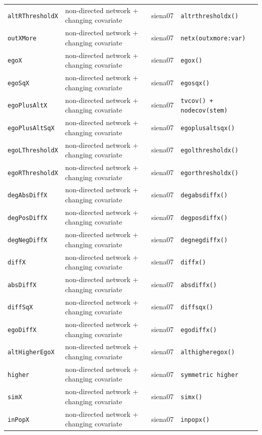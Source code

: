 \begin{longtable}{@{}p{2.6cm}p{3.2cm}p{2.9cm}p{5.4cm}@{}}
\texttt{altRThresholdX} & non-directed network + changing covariate & siena07 & \texttt{altrthresholdx()}\\
\texttt{outXMore} & non-directed network + changing covariate & siena07 & \texttt{netx(outxmore:var)}\\
\texttt{egoX} & non-directed network + changing covariate & siena07 & \texttt{egox()}\\
\texttt{egoSqX} & non-directed network + changing covariate & siena07 & \texttt{egosqx()}\\
\texttt{egoPlusAltX} & non-directed network + changing covariate & siena07 & \texttt{tvcov() + nodecov(stem)}\\
\texttt{egoPlusAltSqX} & non-directed network + changing covariate & siena07 & \texttt{egoplusaltsqx()}\\
\texttt{egoLThresholdX} & non-directed network + changing covariate & siena07 & \texttt{egolthresholdx()}\\
\texttt{egoRThresholdX} & non-directed network + changing covariate & siena07 & \texttt{egorthresholdx()}\\
\texttt{degAbsDiffX} & non-directed network + changing covariate & siena07 & \texttt{degabsdiffx()}\\
\texttt{degPosDiffX} & non-directed network + changing covariate & siena07 & \texttt{degposdiffx()}\\
\texttt{degNegDiffX} & non-directed network + changing covariate & siena07 & \texttt{degnegdiffx()}\\
\texttt{diffX} & non-directed network + changing covariate & siena07 & \texttt{diffx()}\\
\texttt{absDiffX} & non-directed network + changing covariate & siena07 & \texttt{absdiffx()}\\
\texttt{diffSqX} & non-directed network + changing covariate & siena07 & \texttt{diffsqx()}\\
\texttt{egoDiffX} & non-directed network + changing covariate & siena07 & \texttt{egodiffx()}\\
\texttt{altHigherEgoX} & non-directed network + changing covariate & siena07 & \texttt{althigheregox()}\\
\texttt{higher} & non-directed network + changing covariate & siena07 & \texttt{symmetric higher}\\
\texttt{simX} & non-directed network + changing covariate & siena07 & \texttt{simx()}\\
\texttt{inPopX} & non-directed network + changing covariate & siena07 & \texttt{inpopx()}\\

\end{longtable}
